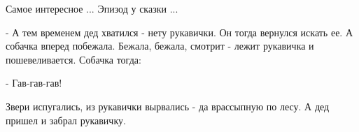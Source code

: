  
 
 
 
 

\qqSecCmt


Самое интересное ... Эпизод у сказки ...

- А тем временем дед хватился - нету рукавички. Он тогда вернулся искать ее. А
собачка вперед побежала. Бежала, бежала, смотрит - лежит рукавичка и
пошевеливается. Собачка тогда:

- Гав-гав-гав!

Звери испугались, из рукавички вырвались - да врассыпную по лесу. А дед пришел
и забрал рукавичку.
